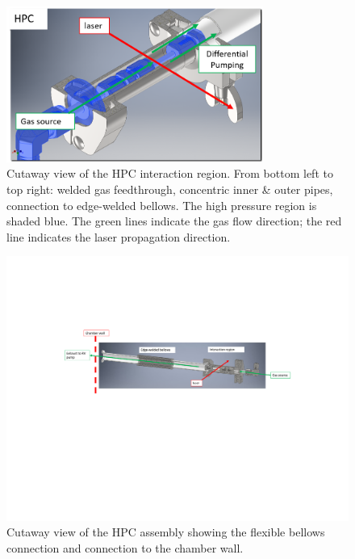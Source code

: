 \begin{figure}
	\centering
	\includegraphics[width=0.75\textwidth]{figures/chap3/HPC_cutaway2.png}
	\caption{Cutaway view of the HPC interaction region. From bottom left to top right: welded gas feedthrough, concentric inner \& outer pipes, connection to edge-welded bellows. The high pressure region is shaded blue. The green lines indicate the gas flow direction; the red line indicates the laser propagation direction.}
	\label{fig:HPC_cutaway2}
\end{figure}

\begin{figure}
	\centering
	\includegraphics[width=1.0\textwidth]{figures/chap3/HPC_cutaway_bellows.pdf}
	\caption{Cutaway view of the HPC assembly showing the flexible bellows connection and connection to the chamber wall.}
	\label{fig:HPC_cutaway_bellows}
\end{figure}

